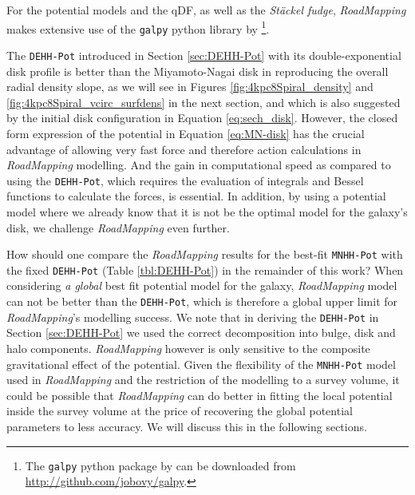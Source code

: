 \documentclass[iop,revtex4,numberedappendix,appendixfloats]{emulateapj}
\newcommand{\RM}{{\sl RoadMapping}}
\begin{document}
For the potential models and the qDF, as well as the  \emph{St\"{a}ckel fudge}, \RM{} makes extensive use of the \texttt{galpy} python library by \citet{2015ApJS..216...29B}\footnote{The \texttt{galpy} python package by \citet{2015ApJS..216...29B} can be downloaded from \url{http://github.com/jobovy/galpy}.}.

The \texttt{DEHH-Pot} introduced in Section \ref{sec:DEHH-Pot} with its double-exponential disk profile is better than the Miyamoto-Nagai disk in reproducing the overall radial density slope, as we will see in Figures \ref{fig:4kpc8Spiral_density} and \ref{fig:4kpc8Spiral_vcirc_surfdens} in the next section, and which is also suggested by the initial disk configuration in Equation \eqref{eq:sech_disk}. However, the closed form expression of the potential in Equation \eqref{eq:MN-disk} has the crucial advantage of allowing very fast force and therefore action calculations in \RM{} modelling. And the gain in computational speed as compared to using the \texttt{DEHH-Pot}, which requires the evaluation of integrals and Bessel functions to calculate the forces, is essential. In addition, by using a potential model where we already know that it is not be the optimal model for the galaxy's disk, we challenge \RM{} even further.

How should one compare the \RM{} results for the best-fit \texttt{MNHH-Pot} with the fixed \texttt{DEHH-Pot} (Table \ref{tbl:DEHH-Pot}) in the remainder of this work? When considering \emph{a global} best fit potential model for the galaxy, \RM{} model can not be better than the \texttt{DEHH-Pot}, which is therefore a global upper limit for \RM{}'s modelling success. We note that in deriving the \texttt{DEHH-Pot} in Section \ref{sec:DEHH-Pot} we used the correct decomposition into bulge, disk and halo components. \RM{} however is only sensitive to the composite gravitational effect of the potential. Given the flexibility of the \texttt{MNHH-Pot} model used in \RM{} and the restriction of the modelling to a survey volume, it could be possible that \RM{} can do better in fitting the local potential inside the survey volume at the price of recovering the global potential parameters to less accuracy. We will discuss this in the following sections.

\end{document}
